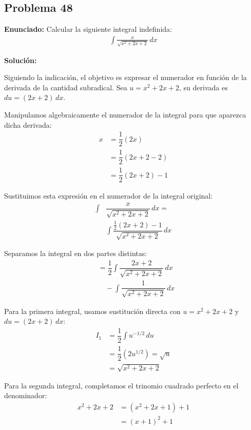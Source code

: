 \subsection*{Problema 48}

\textbf{Enunciado:}
Calcular la siguiente integral indefinida:
\begin{align*}
\int \frac{x}{\sqrt{x^2 + 2x + 2}} \, dx
\end{align*}

\textbf{Solución:}

Siguiendo la indicación, el objetivo es expresar el numerador en función de la derivada de la cantidad subradical. Sea $u = x^2 + 2x + 2$, su derivada es $du = (2x + 2) \, dx$. 

Manipulamos algebraicamente el numerador de la integral para que aparezca dicha derivada:
\begin{align*}
x &= \dfrac{1}{2}(2x) \\
&= \dfrac{1}{2}(2x + 2 - 2) \\
&= \dfrac{1}{2}(2x + 2) - 1
\end{align*}

Sustituimos esta expresión en el numerador de la integral original:
\begin{align*}
\int &\dfrac{x}{\sqrt{x^2 + 2x + 2}} \, dx = \\
&\int \dfrac{\frac{1}{2}(2x + 2) - 1}{\sqrt{x^2 + 2x + 2}} \, dx
\end{align*}

Separamos la integral en dos partes distintas:
\begin{align*}
&= \dfrac{1}{2} \int \dfrac{2x + 2}{\sqrt{x^2 + 2x + 2}} \, dx \\
&\quad - \int \dfrac{1}{\sqrt{x^2 + 2x + 2}} \, dx
\end{align*}

Para la primera integral, usamos sustitución directa con $u = x^2 + 2x + 2$ y $du = (2x + 2) \, dx$:
\begin{align*}
I_1 &= \dfrac{1}{2} \int u^{-1/2} \, du \\
&= \dfrac{1}{2} \left( 2u^{1/2} \right) = \sqrt{u} \\
&= \sqrt{x^2 + 2x + 2}
\end{align*}

Para la segunda integral, completamos el trinomio cuadrado perfecto en el denominador:
\begin{align*}
x^2 + 2x + 2 &= (x^2 + 2x + 1) + 1 \\
&= (x + 1)^2 + 1
\end{align*}

